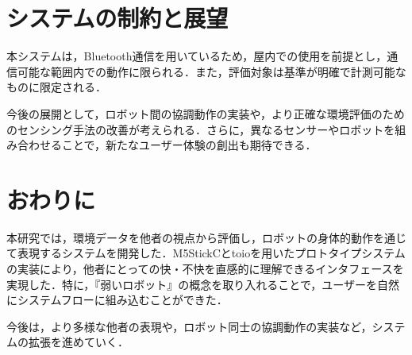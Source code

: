 \documentclass[paper=a4paper,jafontsize=9pt,head_space=15mm,gutter=20mm,
twocolumn,number_of_lines=49, line_length=26zw]{myuarticle}
\begin{document}
\section{システムの制約と展望}
本システムは，Bluetooth通信を用いているため，屋内での使用を前提とし，通信可能な範囲内での動作に限られる．また，評価対象は基準が明確で計測可能なものに限定される．

今後の展開として，ロボット間の協調動作の実装や，より正確な環境評価のためのセンシング手法の改善が考えられる．さらに，異なるセンサーやロボットを組み合わせることで，新たなユーザー体験の創出も期待できる．

\section{おわりに}
本研究では，環境データを他者の視点から評価し，ロボットの身体的動作を通じて表現するシステムを開発した．M5StickCとtoioを用いたプロトタイプシステムの実装により，他者にとっての快・不快を直感的に理解できるインタフェースを実現した．特に，『弱いロボット』の概念を取り入れることで，ユーザーを自然にシステムフローに組み込むことができた．

今後は，より多様な他者の表現や，ロボット同士の協調動作の実装など，システムの拡張を進めていく．

\renewcommand{\refname}{　参考文献}


\end{document}
